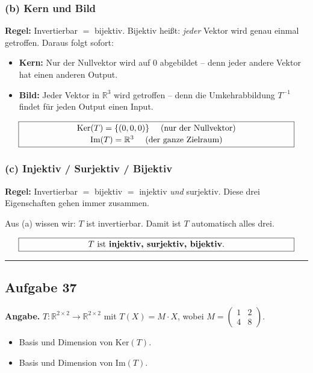 \documentclass[a4paper,12pt]{article}
\begin{document}
\subsubsection*{(b) Kern und Bild}

\textbf{Regel:} Invertierbar $=$ bijektiv. Bijektiv hei\ss t: \emph{jeder} Vektor wird genau einmal getroffen. Daraus folgt sofort:

\begin{itemize}[leftmargin=*, nosep]
    \item \textbf{Kern:} Nur der Nullvektor wird auf $0$ abgebildet -- denn jeder andere Vektor hat einen anderen Output.
    \item \textbf{Bild:} Jeder Vektor in $\mathbb{R}^3$ wird getroffen -- denn die Umkehrabbildung $T^{-1}$ findet f\"ur jeden Output einen Input.
\end{itemize}

\[
\fbox{\parbox{0.93\textwidth}{\centering
$\text{Ker}(T) = \{(0, 0, 0)\}$ \quad (nur der Nullvektor) \\[2pt]
$\text{Im}(T) = \mathbb{R}^3$ \quad (der ganze Zielraum)
}}
\]

\subsubsection*{(c) Injektiv / Surjektiv / Bijektiv}

\textbf{Regel:} Invertierbar $=$ bijektiv $=$ injektiv \emph{und} surjektiv. Diese drei Eigenschaften gehen immer zusammen.

Aus (a) wissen wir: $T$ ist invertierbar. Damit ist $T$ automatisch alles drei.

\[
\fbox{\parbox{0.93\textwidth}{\centering
$T$ ist \textbf{injektiv, surjektiv, bijektiv}.
}}
\]

\bigskip
\hrule
\bigskip

\subsection*{Aufgabe 37}

\textbf{Angabe.} $T \colon \mathbb{R}^{2 \times 2} \to \mathbb{R}^{2 \times 2}$ mit $T(X) = M \cdot X$, wobei $M = \begin{pmatrix} 1 & 2 \\ 4 & 8 \end{pmatrix}$.
\begin{itemize}[nosep]
\item[(a)] Basis und Dimension von $\text{Ker}(T)$.
\item[(b)] Basis und Dimension von $\text{Im}(T)$.
\end{itemize}
\end{document}
